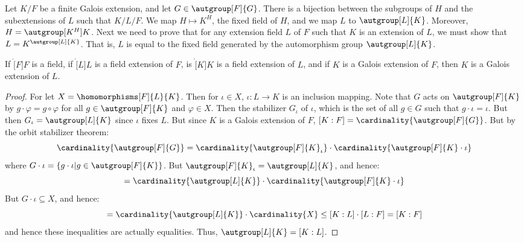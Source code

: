     Let $K/F$ be a finite Galois extension, and let $G\in\autgroup[F]{G}$.
    There is a bijection between the subgroups of $H$ and the subextensions
    of $L$ such that $K/L/F$. We map $H\mapsto{K}^{H}$, the fixed field
    of $H$, and we map $L$ to $\autgroup[L]{K}$. Moreover,
    $H=\autgroup[K^{H}]{K}$. Next we need to prove that for any extension
    field $L$ of $F$ such that $K$ is an extension of $L$, we must show
    that $L=K^{\autgroup[L]{K}}$. That is, $L$ is equal to the fixed field
    generated by the automorphism group $\autgroup[L]{K}$.
    \begin{theorem}
        If $\ring[F]{F}$ is a field, if $\ring[L]{L}$ is a field
        extension of $F$, is $\ring[K]{K}$ is a field extension of $L$,
        and if $K$ is a Galois extension of $F$, then $K$ is a Galois
        extension of $L$.
    \end{theorem}
    \begin{proof}
        For let $X=\homomorphisms[F]{L}{K}$. Then for $\iota\in{X}$,
        $\iota:L\rightarrow{K}$ is an inclusion mapping. Note that
        $G$ acts on $\autgroup[F]{K}$ by $g\cdot\varphi=g\circ\varphi$
        for all $g\in\autgroup[F]{K}$ and $\varphi\in{X}$. Then the
        stabilizer $G_{\iota}$ of $\iota$, which is the set of all
        $g\in{G}$ such that $g\cdot\iota=\iota$. But then
        $G_{\iota}=\autgroup[L]{K}$ since $\iota$ fixes $L$. But since $K$
        is a Galois extension of $F$,
        $[K:F]=\cardinality{\autgroup[F]{G}}$. But by the orbit stabilizer
        theorem:
        \begin{equation}
            \cardinality{\autgroup[F]{G}}
            =\cardinality{\autgroup[F]{K}_{\iota}}\cdot
                \cardinality{\autgroup[F]{K}\cdot\iota}
        \end{equation}
        where $G\cdot\iota=\{g\cdot\iota|g\in\autgroup[F]{K}\}$. But
        $\autgroup[F]{K}_{\iota}=\autgroup[L]{K}$, and hence:
        \begin{equation}
            [K:F]=\cardinality{\autgroup[L]{K}}\cdot
                \cardinality{\autgroup[F]{K}\cdot\iota}
        \end{equation}
        But $G\cdot\iota\subseteq{X}$, and hence:
        \begin{equation}
            [K:F]=\cardinality{\autgroup[L]{K}}\cdot\cardinality{X}
            \leq[K:L]\cdot[L:F]=[K:F]
        \end{equation}
        and hence these inequalities are actually equalities. Thus,
        $\autgroup[L]{K}=[K:L]$.
    \end{proof}
